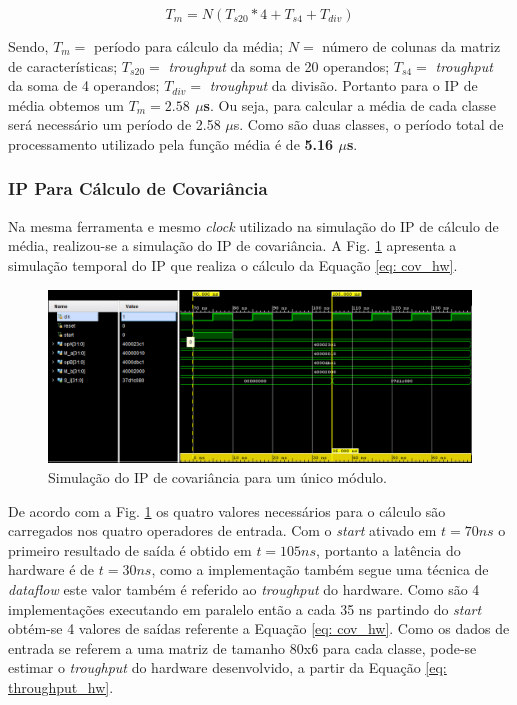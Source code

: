 \begin{equation}
\label{eq: throughput}
	T_m = N(T_{s20}*4 + T_{s4} + T_{div})  
\end{equation}

Sendo, $T_m =$ período para cálculo da média; $N =$ número de colunas da matriz de características; $T_{s20} =$ \textit{troughput} da soma de 20 operandos; $T_{s4} =$ \textit{troughput} da soma de 4 operandos; $T_{div} =$ \textit{troughput} da divisão. Portanto para o IP de média obtemos um \textbf{$T_m = 2.58$ $\mu$s}. Ou seja, para calcular a média de cada classe será necessário um período de 2.58 $\mu$s. Como são duas classes, o período total de processamento utilizado pela função média é de \textbf{5.16 $\mu$s}.

\subsubsection{IP Para Cálculo de Covariância}

Na mesma ferramenta e mesmo \textit{clock} utilizado na simulação do IP de cálculo de média, realizou-se a simulação do IP de covariância. A Fig. \ref{simulacao_cov} apresenta a simulação temporal do IP que realiza o cálculo da Equação \ref{eq: cov_hw}.


\begin{figure}[!h]
	\centering
	\includegraphics[keepaspectratio=true,scale=0.5]{figuras/Simulacao_cov.PNG}
	\caption{Simulação do IP de covariância para um único módulo.}
	\label{simulacao_cov}
\end{figure}

De acordo com a Fig. \ref{simulacao_cov} os quatro valores necessários para o cálculo são carregados nos quatro operadores de entrada. Com o \textit{start} ativado em $t = 70 ns$ o primeiro resultado de saída é obtido em $t = 105 ns$, portanto a latência do hardware é de $t = 30 ns$, como a implementação também segue uma técnica de \textit{dataflow} este valor também é referido ao \textit{troughput} do hardware. Como são 4 implementações executando em paralelo então a cada 35 ns partindo do \textit{start} obtém-se 4 valores de saídas referente a Equação \ref{eq: cov_hw}. Como os dados de entrada se referem a uma matriz de tamanho 80x6 para cada classe, pode-se estimar o \textit{troughput} do hardware desenvolvido, a partir da Equação \ref{eq: throughput_hw}.

